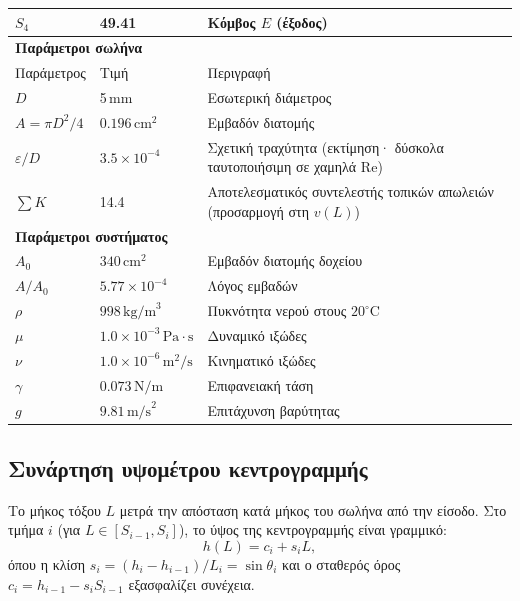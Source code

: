 \documentclass[11pt]{article}
\begin{document}
\begin{table}[H]
\begin{tabular}{llll}
$S_4$ & 49.41 & \multicolumn{2}{l}{Κόμβος $E$ (έξοδος)} \\
\midrule
\multicolumn{4}{l}{\textbf{Παράμετροι σωλήνα}} \\
\midrule
Παράμετρος & Τιμή & \multicolumn{2}{l}{Περιγραφή} \\
\midrule
$D$ & 5\,mm & \multicolumn{2}{l}{Εσωτερική διάμετρος} \\
$A = \pi D^2/4$ & $0.196\,\text{cm}^2$ & \multicolumn{2}{l}{Εμβαδόν διατομής} \\
$\varepsilon/D$ & $3.5\times 10^{-4}$ & \multicolumn{2}{l}{Σχετική τραχύτητα (εκτίμηση· δύσκολα ταυτοποιήσιμη σε χαμηλά Re)} \\
$\sum K$ & 14.4 & \multicolumn{2}{l}{Αποτελεσματικός συντελεστής τοπικών απωλειών (προσαρμογή στη $v(L)$)} \\
\midrule
\multicolumn{4}{l}{\textbf{Παράμετροι συστήματος}} \\
\midrule
$A_0$ & $340\,\text{cm}^2$ & \multicolumn{2}{l}{Εμβαδόν διατομής δοχείου} \\
$A/A_0$ & $5.77\times 10^{-4}$ & \multicolumn{2}{l}{Λόγος εμβαδών} \\
$\rho$ & $998\,\text{kg/m}^3$ & \multicolumn{2}{l}{Πυκνότητα νερού στους $20^\circ$C} \\
$\mu$ & $1.0 \times 10^{-3}\,\text{Pa}\cdot\text{s}$ & \multicolumn{2}{l}{Δυναμικό ιξώδες} \\
$\nu$ & $1.0 \times 10^{-6}\,\text{m}^2/\text{s}$ & \multicolumn{2}{l}{Κινηματικό ιξώδες} \\
$\gamma$ & $0.073\,\text{N/m}$ & \multicolumn{2}{l}{Επιφανειακή τάση} \\
$g$ & $9.81\,\text{m/s}^2$ & \multicolumn{2}{l}{Επιτάχυνση βαρύτητας} \\
\bottomrule
\end{tabular}
\end{table}

\subsection{Συνάρτηση υψομέτρου κεντρογραμμής}

Το μήκος τόξου $L$ μετρά την απόσταση κατά μήκος του σωλήνα από την είσοδο. Στο τμήμα $i$ (για $L \in [S_{i-1}, S_i]$), το ύψος της κεντρογραμμής είναι γραμμικό:
\begin{equation}
  h(L) = c_i + s_i L,
  \label{eq:hL-piecewise}
\end{equation}
όπου η κλίση $s_i = (h_i - h_{i-1})/L_i = \sin\theta_i$ και ο σταθερός όρος $c_i = h_{i-1} - s_i S_{i-1}$ εξασφαλίζει συνέχεια.
\end{document}
